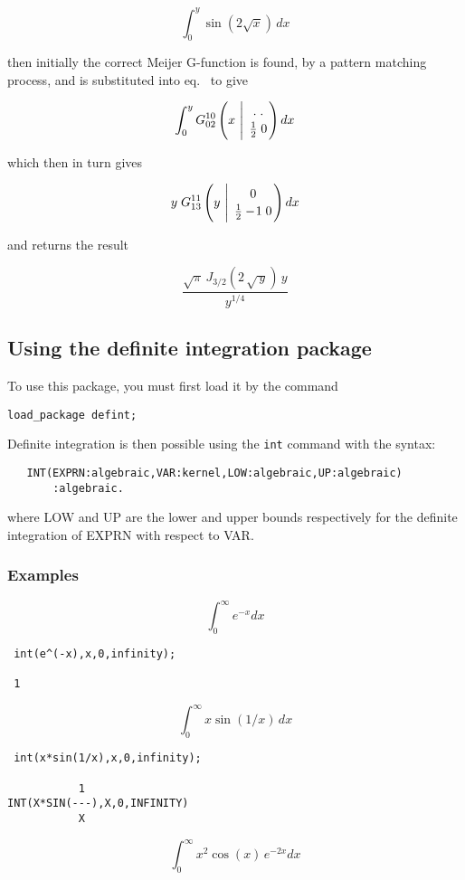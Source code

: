 \[
\int_{0}^{y} \sin(2 \sqrt{x}) \, dx
\]

then initially the correct Meijer G-function is found, by a pattern
matching process, and is substituted
into eq.~ to give

\[
\int_{0}^{y} G^{1 0}_{0 2}\left(x
\ \Bigg\vert \ \MeijerGparams{. \; .}{\frac{1}{2} \; 0} \right) dx
\]

which then in turn gives

\[
y \; G^{1 1}_{1 3}\left(y \ \Bigg\vert \ \MeijerGparams{0}{\frac{1}{2} -\!1 \; 0} \right) dx
\]

and returns the result

\[
\frac{\sqrt{\pi} \, J_{3/2}(2 \, \sqrt{\,y}) \, y}{y^{1/4}}
\]

\subsection{Using the definite integration package}
To use this package, you must first load it by the command
\begin{verbatim}
load_package defint;
\end{verbatim}
Definite integration is then possible using the \verb+int+
command with the syntax:
\begin{verbatim}
   INT(EXPRN:algebraic,VAR:kernel,LOW:algebraic,UP:algebraic)
       :algebraic.
\end{verbatim}
where LOW and UP are the lower and upper bounds respectively for
the definite integration of EXPRN with respect to VAR.

\subsubsection{Examples}

\[
\int_{0}^{\infty} e^{-x} dx
\]


\begin{verbatim}
 int(e^(-x),x,0,infinity);

 1
\end{verbatim}

\[
\int_{0}^{\infty} x \sin(1/x) \, dx
\]

\begin{verbatim}
 int(x*sin(1/x),x,0,infinity);

           1
INT(X*SIN(---),X,0,INFINITY)
           X
\end{verbatim}

\[
\int_{0}^{\infty} x^2 \cos(x) \, e^{-2x} dx
\]

